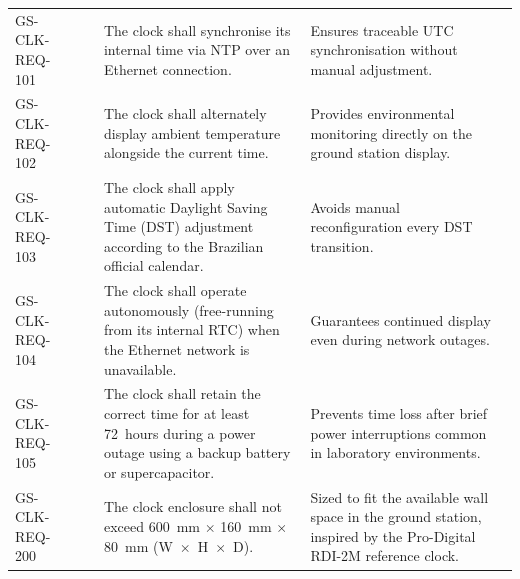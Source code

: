 \begin{landscape}
\begin{longtable}{C{3.5cm} C{2.4cm} C{1.7cm} L{8.5cm} L{5.7cm} C{2.5cm}}
    GS-CLK-REQ-101 &  & 
        & The clock shall synchronise its internal time via NTP over an Ethernet connection.
        & Ensures traceable UTC synchronisation without manual adjustment.
        &  \\[2pt]

    GS-CLK-REQ-102 &  & 
        & The clock shall alternately display ambient temperature alongside the current time.
        & Provides environmental monitoring directly on the ground station display.
        &  \\[2pt]

    GS-CLK-REQ-103 &  & 
        & The clock shall apply automatic Daylight Saving Time (DST) adjustment according to the Brazilian official calendar.
        & Avoids manual reconfiguration every DST transition.
        &  \\[2pt]

    GS-CLK-REQ-104 &  & 
        & The clock shall operate autonomously (free-running from its internal RTC) when the Ethernet network is unavailable.
        & Guarantees continued display even during network outages.
        &  \\[2pt]

    GS-CLK-REQ-105 &  & 
        & The clock shall retain the correct time for at least 72~hours during a power outage using a backup battery or supercapacitor.
        & Prevents time loss after brief power interruptions common in laboratory environments.
        &  \\[2pt]

    GS-CLK-REQ-200 &  & 
        & The clock enclosure shall not exceed 600~mm $\times$ 160~mm $\times$ 80~mm (W~$\times$~H~$\times$~D).
        & Sized to fit the available wall space in the ground station, inspired by the Pro-Digital RDI-2M reference clock.
        &  \\[2pt]


\end{longtable}
\end{landscape}
